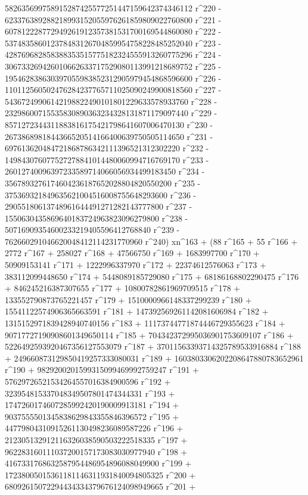        582635699758915287425577251447159642374346112 r^220 - 
       623376389288218993152055976261859809022760800 r^221 - 
       607812228772949261912357381531700169544860080 r^222 - 
       537483586012378483126704859954758228485252040 r^223 - 
       428769682858388353515775182324555913260775296 r^224 - 
       306733269426010662633717529080113991218689752 r^225 - 
       195462838630397055983852312905979454868596600 r^226 - 
       110112560502476284237765711025090249900818560 r^227 - 
       54367249906142198822490101801229633578933760 r^228 - 
       23298600715535830890363234328131871179097440 r^229 - 
       8571272344311883816175421798641607006470130 r^230 - 
       2673868981844366520514166400639750505114650 r^231 - 
       697613620484721868786342111396521312302220 r^232 - 
       149843076077527278841014480060994716769170 r^233 - 
       26012740096397233589714066056934499183450 r^234 - 
       3567893276174604236187652028804820550200 r^235 - 
       375369321849635621004516008755648293600 r^236 - 
       29055180613748961644491271282143777800 r^237 - 
       1550630435869640183724963823096279800 r^238 - 
       50716909354600233219405596412768840 r^239 - 
       762660291046620048412114231770960 r^240) xn^163 + (88 r^165 + 
       55 r^166 + 2772 r^167 + 258027 r^168 + 47566750 r^169 + 
       1683997700 r^170 + 50909153141 r^171 + 1222996337970 r^172 + 
       22374612576063 r^173 + 383112099448650 r^174 + 
       5448089185729080 r^175 + 68186168802290475 r^176 + 
       846245216387307655 r^177 + 10800782861969709515 r^178 + 
       133552790873765221457 r^179 + 1510000966148337299239 r^180 + 
       15541122574906365663591 r^181 + 
       147392569261142081606984 r^182 + 
       1315152971839428940740156 r^183 + 
       11173744771874446729355623 r^184 + 
       90717727190908601349650114 r^185 + 
       704342372995036901753609107 r^186 + 
       5226492593920467356127553079 r^187 + 
       37011563393714325789533916884 r^188 + 
       249660873129850419257333080031 r^189 + 
       1603803306202208647880783652961 r^190 + 
       9829200201599315099469992759247 r^191 + 
       57629726521534264557016384900596 r^192 + 
       323954815337048349507801474344331 r^193 + 
       1747260174607285992420190009913181 r^194 + 
       9037555501345838629843355846396572 r^195 + 
       44779804310915261130498236089587226 r^196 + 
       212305132912116326038590503222518335 r^197 + 
       962283160111037200157173083030977940 r^198 + 
       4167331768632587954486954896088049900 r^199 + 
       17238005015361181146311931840094805325 r^200 + 
       68092615072294434334379676124098949665 r^201 + 
